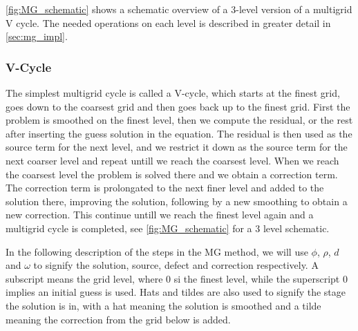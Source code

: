 	\cref{fig:MG_schematic} shows a schematic overview of a \(3\)-level
	version of a multigrid V cycle. The needed operations on each
	level is described in greater detail in \cref{sec:mg_impl}.

	\subsubsection{V-Cycle}
		The simplest multigrid cycle is called a V-cycle, which starts at the finest grid, goes down to the coarsest grid and then goes back up
		to the finest grid.	First the problem is smoothed on the finest level, then we compute the residual, or the rest after inserting the guess solution
		in the equation. The residual is then used as the source term for the next level, and we restrict it down as the source term for the next
		coarser level and repeat untill we reach the coarsest level. When we reach the coarsest level the problem is solved there and we obtain a correction
		term. The correction term is prolongated to the next finer level and added to the solution there, improving the solution, following by a new smoothing
		to obtain a new correction. This continue untill we reach the finest level again and a multigrid cycle is completed, see \cref{fig:MG_schematic} for a 3
		level schematic.

		In the following description of the steps in the MG method, we will use \(\phi\), \(\rho\), \(d\) and \(\omega\) to signify the solution, source,
		defect and correction respectively. A subscript means the grid level, where \(0\) si the finest level, while the superscript \(0\) implies an initial guess is used. Hats and tildes are also
	 	used to signify the stage the solution is in, with a hat meaning the solution is smoothed and a tilde meaning the correction from the grid below is added.

